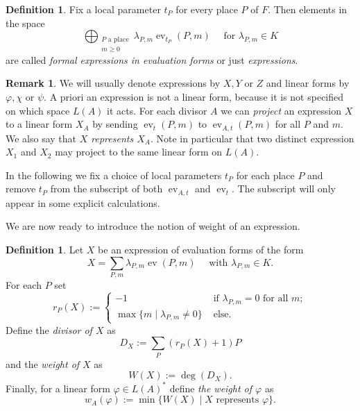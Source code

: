 \documentclass[12pt]{amsart}
\renewcommand{\geq}{\geqslant}
\DeclareMathOperator{\ev}{ev}
\theoremstyle{definition}
\newtheorem{definition}[theorem]{Definition}
\newtheorem{remark}[theorem]{Remark}
\begin{document}
	\begin{definition}
		Fix a local parameter $t_P$ for every place $P$ of $F$. Then elements in the space
		$$\bigoplus_{\substack{P\text{ a place} \\  m\geq 0}} \lambda_{P, m}\ev_{t_P}(P, m) \quad \text{ for } \lambda_{P, m} \in K$$
		are called \textit{formal expressions in evaluation forms} or just \textit{expressions}. 
	\end{definition}
	\begin{remark}
		We will usually denote expressions by $X, Y$ or $Z$ and linear forms by $\varphi, \chi$ or $\psi$. A priori an expression is not a linear form, because it is not specified on which space $L(A)$ it acts. For each divisor $A$ we can \textit{project} an expression $X$ to a linear form $X_A$ by sending $\ev_t(P, m)$ to $\ev_{A, t}(P, m)$ for all $P$ and $m$. We also say that \textit{$X$ represents $X_A$}.
		Note in particular that two distinct expression $X_1$ and $X_2$ may project to the same linear form on $L(A)$.  
	\end{remark}
	
	In the following we fix a choice of local parameters $t_P$ for each place $P$ and remove $t_P$ from the subscript of both $\ev_{A, t}$ and $\ev_t$. The subscript will only appear in some explicit calculations. 
	
	We are now ready to introduce the notion of weight of an expression. 
	
	\begin{definition}
		Let $X$ be an expression of evaluation forms of the form $$X = \sum_{P, m} \lambda_{P, m} \ev (P, m) \quad \text{ with } \lambda_{P, m} \in K.$$ 
		For each $P$ set 
		$$r_P(X) := \begin{cases} -1 &\text{ if } \lambda_{P, m} = 0 \text{ for all } m; \\
			\max\{m\mid \lambda_{P,m}\neq 0\} &\text{ else.}
		\end{cases}$$
		Define the \textit{divisor of $X$} as 
		$$D_X := \sum_{P} (r_P(X) + 1)P$$
		and the \textit{weight of $X$} as 
		$$W(X) := \deg(D_X).$$ 
		Finally, for a linear form $\varphi \in L(A)^\ast$ define \textit{the weight of $\varphi$} as 
		$$w_A(\varphi) := \min\{W(X) \mid X \text{ represents } \varphi \}.$$ 
	\end{definition}
	
\end{document}
